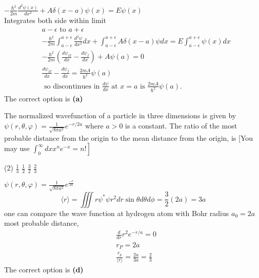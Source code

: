 \begin{enumerate}
\begin{answer}
	$-\frac{\hbar^{2}}{2 m} \frac{d^{2} \psi(x)}{d x^{2}}+A \delta(x-a) \psi(x)=E \psi(x)$\\
	Integrates both side within limit
	\begin{align*}
	&a-\epsilon \text { to } a+\epsilon \\
	&-\frac{\hbar^{2}}{2 m} \int_{a-\epsilon}^{a+\epsilon} \frac{d^{2} \psi}{d x^{2}} d x+\int_{a-\epsilon}^{a+\epsilon} A \delta(x-a) \psi d x=E \int_{a-\epsilon}^{a+\epsilon} \psi(x) d x \\
	&-\frac{\hbar^{2}}{2 m}\left(\frac{d \psi_{I I}}{d x}-\frac{d \psi_{I}}{d x}\right)+A \psi(a)=0 \\
	&\frac{d \psi_{I I}}{d x}-\frac{d \psi_{I}}{d x}=\frac{2 m A}{\hbar^{2}} \psi(a) \\
	&\text { so discontinues in } \frac{d \psi}{d x} \text { at } x=a \text { is } \frac{2 m A}{\hbar^{2}} \psi(a) .
	\end{align*}
	The correct option is \textbf{(a)}
\end{answer}
\begin{minipage}{\textwidth}
	\item The normalized wavefunction of a particle in three dimensions is given by $\psi(r, \theta, \varphi)=\frac{1}{\sqrt{8 \pi a^{3}}} e^{-r / 2 a}$ where $a>0$ is a constant. The ratio of the most probable distance from the origin to the mean distance from the origin, is
	[You may use $\left.\int_{0}^{\infty} d x x^{n} e^{-x}=n !\right]$
\end{minipage}
\begin{tasks}(2)
	\task[\textbf{A.}] $\frac{1}{3}$
	\task[\textbf{B.}]$\frac{1}{2}$
	\task[\textbf{C.}]$\frac{3}{2}$
	\task[\textbf{D.}]$\frac{2}{3}$
\end{tasks}
\begin{answer}
	$\psi(r, \theta, \varphi)=\frac{1}{\sqrt{8 \pi a^{3}}} e^{\frac{-r}{2 a}}$\\
	$$
	\langle r\rangle=\iiint r \psi^{*} \psi r^{2} d r \sin \theta d \theta d \phi=\frac{3}{2}(2 a)=3 a
	$$
	one can compare the wave function at hydrogen atom with Bohr radius $a_{0}=2 a$ most probable distance,\\
	\begin{align*}
		&\frac{d}{d r} r^{2} e^{-r / a}=0 \\
		&r_{P}=2 a \\
		&\frac{r_{p}}{\langle r\rangle}=\frac{2 a}{3 a}=\frac{2}{3}
	\end{align*}
	The correct option is \textbf{(d)}
\end{answer}

\end{enumerate}
